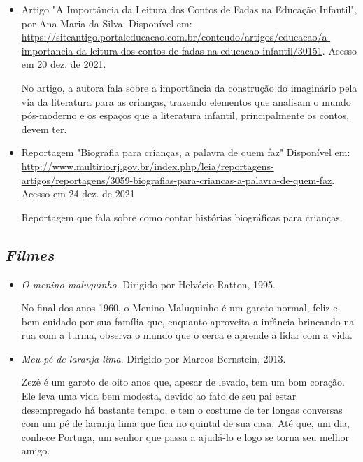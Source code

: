\documentclass[11pt]{extarticle}
\begin{document}
\begin{itemize}
\item Artigo "A Importância da Leitura dos Contos de Fadas na Educação Infantil", por Ana Maria da Silva. Disponível em: \url{https://siteantigo.portaleducacao.com.br/conteudo/artigos/educacao/a-importancia-da-leitura-dos-contos-de-fadas-na-educacao-infantil/30151}. 
Acesso em 20 dez. de 2021.

No artigo, a autora fala sobre a importância da construção do imaginário pela via da literatura para as crianças, trazendo elementos que analisam o mundo pós-moderno e os espaços que a literatura infantil, principalmente os contos, devem ter.

\item Reportagem "Biografia para crianças, a palavra de quem faz" Disponível em: \url{http://www.multirio.rj.gov.br/index.php/leia/reportagens-artigos/reportagens/3059-biografias-para-criancas-a-palavra-de-quem-faz}. Acesso em 24 dez. de 2021

Reportagem que fala sobre como contar histórias biográficas para crianças.

\end{itemize}

\subsection{\textit{Filmes}}

\begin{itemize}
\item \textit{O menino maluquinho}. Dirigido por Helvécio Ratton, 1995.

No final dos anos 1960, o Menino Maluquinho é um garoto normal, feliz e bem cuidado por sua família que, enquanto aproveita a infância brincando na rua com a turma, observa o mundo que o cerca e aprende a lidar com a vida.

\item \textit{Meu pé de laranja lima}. Dirigido por Marcos Bernstein, 2013.

Zezé é um garoto de oito anos que, apesar de levado, tem um bom coração. Ele leva uma vida bem modesta, devido ao fato de seu pai estar desempregado há bastante tempo, e tem o costume de ter longas conversas com um pé de laranja lima que fica no quintal de sua casa. Até que, um dia, conhece Portuga, um senhor que passa a ajudá-lo e logo se torna seu melhor amigo.
\end{itemize}
\end{document}
